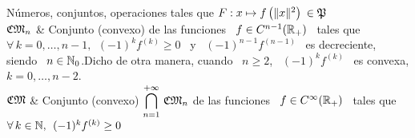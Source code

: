 \begin{notation}{N\'umeros,  conjuntos, operaciones}
tales que $F: x \mapsto f\left( \|x\|^2 \right) \: \in \mathfrak{P}$\\[2.5mm]
\hline
%
$\mathfrak{CM}_n$ & Conjunto (convexo) de las funciones \ $f \in C^{n-1}(\mathbb{R}_+)$ \ tales
que \ $\forall \, k = 0 , \ldots , n-1, \:\: (-1)^k f^{(k)} \ge 0$ \ y \
$(-1)^{n-1} f^{(n-1)}$ \ es decreciente, siendo \ $n \in \mathbb{N}_0$.\newline Dicho
de otra manera, cuando \ $n \ge 2$, \ $(-1)^k f^{(k)}$ \ es convexa, $k = 0,
\ldots , n-2$.\\[2.5mm]
\hline
%
$\mathfrak{CM}$ & Conjunto (convexo) $\displaystyle \bigcap_{n=1}^{+\infty} \, \mathfrak{CM}_n$ de
las funciones \ $f \in C^{\infty}(\mathbb{R}_+)$ \ tales que \ $\forall \, k \in
\mathbb{N}, \:\: (-1)^k f^{(k)} \ge 0$
\end{notation}
